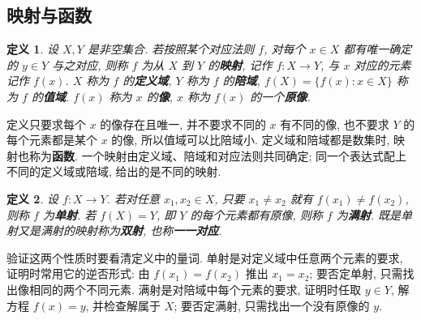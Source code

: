 \documentclass[UTF8,openany]{ctexbook}
\theoremstyle{chinesetextbook}
\newtheorem{definition}{定义}[section]
\begin{document}
\subsection{映射与函数}
\begin{definition}
设 $X,Y$ 是非空集合. 若按照某个对应法则 $f$, 对每个 $x\in X$ 都有唯一确定的 $y\in Y$ 与之对应, 则称 $f$ 为从 $X$ 到 $Y$ 的\textbf{映射}, 记作 $f:X\to Y$, 与 $x$ 对应的元素记作 $f(x)$. $X$ 称为 $f$ 的\textbf{定义域}, $Y$ 称为 $f$ 的\textbf{陪域}, $f(X)=\{f(x):x\in X\}$ 称为 $f$ 的\textbf{值域}. $f(x)$ 称为 $x$ 的\textbf{像}, $x$ 称为 $f(x)$ 的一个\textbf{原像}.
\end{definition}
定义只要求每个 $x$ 的像存在且唯一, 并不要求不同的 $x$ 有不同的像, 也不要求 $Y$ 的每个元素都是某个 $x$ 的像, 所以值域可以比陪域小. 定义域和陪域都是数集时, 映射也称为\textbf{函数}. 一个映射由定义域、陪域和对应法则共同确定; 同一个表达式配上不同的定义域或陪域, 给出的是不同的映射.
\begin{definition}
设 $f:X\to Y$. 若对任意 $x_1,x_2\in X$, 只要 $x_1\ne x_2$ 就有 $f(x_1)\ne f(x_2)$, 则称 $f$ 为\textbf{单射}. 若 $f(X)=Y$, 即 $Y$ 的每个元素都有原像, 则称 $f$ 为\textbf{满射}. 既是单射又是满射的映射称为\textbf{双射}, 也称\textbf{一一对应}.
\end{definition}
验证这两个性质时要看清定义中的量词. 单射是对定义域中任意两个元素的要求, 证明时常用它的逆否形式: 由 $f(x_1)=f(x_2)$ 推出 $x_1=x_2$; 要否定单射, 只需找出像相同的两个不同元素. 满射是对陪域中每个元素的要求, 证明时任取 $y\in Y$, 解方程 $f(x)=y$, 并检查解属于 $X$; 要否定满射, 只需找出一个没有原像的 $y$.
\end{document}
